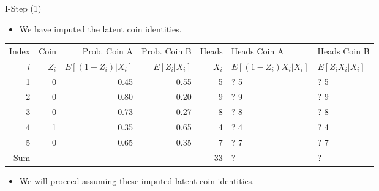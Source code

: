 \documentclass[dvipdfmx,bigger,aspectratio=169]{beamer}
\begin{document}
\begin{frame}[fragile,allowframebreaks,label=,t]{I-Step (1)}
\newpage
\begin{itemize}
\item We have imputed the latent coin identities.
\end{itemize}
\footnotesize
\begin{center}
\begin{tabular}{r|r|rr|r|ll|}
Index & Coin & Prob. Coin A & Prob. Coin B & Heads & Heads Coin A & Heads Coin B\\
\(i\) & \(Z_{i}\) & \(E[(1-Z_{i})\vert X_{i}]\) & \(E[Z_{i}\vert X_{i}]\) & \(X_{i}\) & \(E[(1-Z_{i}) X_{i} \vert X_{i}]\) & \(E[Z_{i} X_{i} \vert X_{i}]\)\\
\hline
1 & 0 & 0.45 & 0.55 & 5 & ? \texttimes{} 5 & ? \texttimes{} 5\\
2 & 0 & 0.80 & 0.20 & 9 & ? \texttimes{} 9 & ? \texttimes{} 9\\
3 & 0 & 0.73 & 0.27 & 8 & ? \texttimes{} 8 & ? \texttimes{} 8\\
4 & 1 & 0.35 & 0.65 & 4 & ? \texttimes{} 4 & ? \texttimes{} 4\\
5 & 0 & 0.65 & 0.35 & 7 & ? \texttimes{} 7 & ? \texttimes{} 7\\
\hline
Sum &  &  &  & 33 & ? & ?\\
\end{tabular}
\end{center}
\normalsize
\begin{itemize}
\item We will proceed assuming these imputed latent coin identities.
\end{itemize}


\end{frame}
\end{document}
